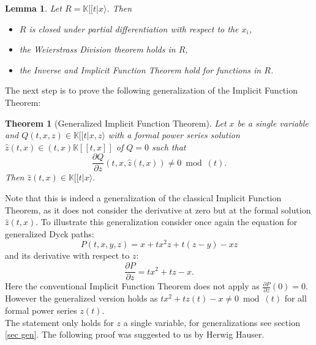\documentclass[10pt, a4paper]{article}
\newtheorem{theorem}{Theorem}[section]
\def\wh{\widehat}
\newtheorem{lemma}{Lemma}[section]
\theoremstyle{remark}
\theoremstyle{remark}
\begin{document}
\begin{lemma}
Let $R=\mathbb{K}[[t\vert x\rangle$. Then
    \begin{itemize}
        \item $R$ is closed under partial differentiation with respect to the $x_i$,
        \item the Weierstrass Division theorem holds in $R$,
        \item the Inverse and Implicit Function Theorem hold for functions in $R$.
    \end{itemize}
\end{lemma}
 \noindent The next step is to prove the following generalization of the Implicit Function Theorem:
\begin{theorem}[Generalized Implicit Function Theorem]\label{easier ''}
    Let $x$ be a single variable and $Q(t,x,z)\in\mathbb{K}[[t\vert x,z\rangle$ with a formal power series solution $\wh{z}(t,x)\in (t,x)\mathbb{K}[[t,x]]$ of $Q=0$ such that $$\frac{\partial Q}{\partial z}(t,x,\wh{z}(t,x))\neq0\bmod (t).$$ Then $\wh{z}(t,x)\in \mathbb{K}[[t\vert x\rangle$.   
\end{theorem}
 \noindent Note that this is indeed a generalization of the classical Implicit Function Theorem, as it does not consider the derivative at zero but at the formal solution $\wh{z}(t,x)$. To illustrate this generalization consider once again the equation for generalized Dyck paths: $$P(t,x,y,z)=x+tx^2z+t(z-y)-xz$$ and its derivative with respect to $z:$
$$\frac{\partial P}{\partial z}=tx^2+tz-x.$$
Here the conventional Implicit Function Theorem does not apply as $\frac{\partial P}{\partial z}(0)=0 $. However the generalized version holds as $tx^2+tz(t)-x\neq0\bmod (t)$ for all formal power series $z(t)$.
\\The statement only holds for $z$ a single variable, for generalizations see section \ref{sec gen}. The following proof was suggested to us by Herwig Hauser.
\end{document}

